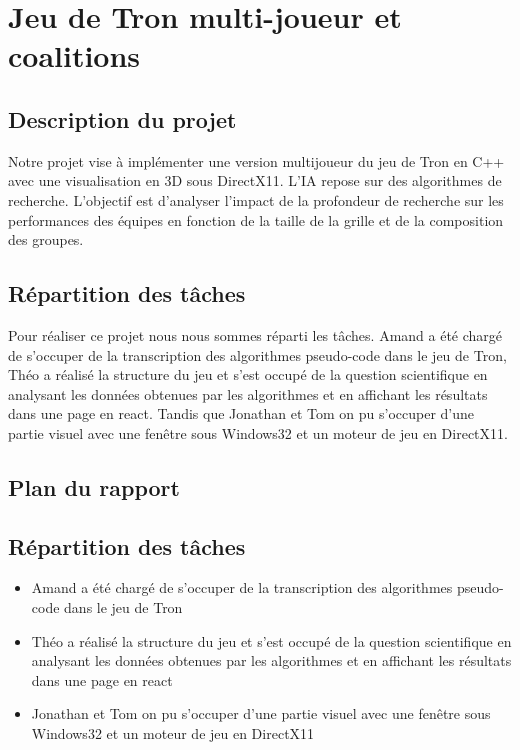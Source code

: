 \section{Jeu de Tron multi-joueur et coalitions}
\subsection{Description du projet}
Notre projet vise à implémenter une version multijoueur du jeu de Tron en C++ avec une visualisation en 3D sous DirectX11. L'IA repose sur des algorithmes de recherche. L'objectif est d'analyser l'impact de la profondeur de recherche sur les performances des équipes en fonction de la taille de la grille et de la composition des groupes.

\subsection{Répartition des tâches}
Pour réaliser ce projet nous nous sommes réparti les tâches. Amand a été chargé de s'occuper de la transcription des algorithmes pseudo-code dans le jeu de Tron, Théo a réalisé la structure du jeu et s'est occupé de la question scientifique en analysant les données obtenues par les algorithmes et en affichant les résultats dans une page en react. Tandis que Jonathan et Tom on pu s'occuper d'une partie visuel avec une fenêtre sous Windows32 et un moteur de jeu en DirectX11.

\subsection{Plan du rapport}
\tableofcontents

\subsection{Répartition des tâches}
\begin{itemize}
    \item Amand a été chargé de s'occuper de la transcription des algorithmes pseudo-code dans le jeu de Tron
    \item Théo a réalisé la structure du jeu et s'est occupé de la question scientifique en analysant les données obtenues par les algorithmes et en affichant les résultats dans une page en react
    \item Jonathan et Tom on pu s'occuper d'une partie visuel avec une fenêtre sous Windows32 et un moteur de jeu en DirectX11
\end{itemize}
